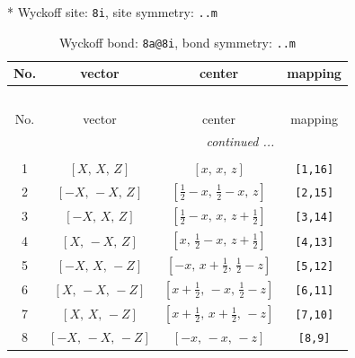 \documentclass[fleqn,8pt]{jsarticle}
\begin{document}
* Wyckoff site: {\tt 8i}, site symmetry: {\tt ..m}
\renewcommand{\arraystretch}{1.2}
\begin{longtable}{cccc}
\caption{Wyckoff bond: {\tt 8a@8i}, bond symmetry: {\tt ..m}}
 \\
 \hline \hline
No. & vector & center & mapping \\ \hline \endfirsthead

\multicolumn{3}{l}{\tablename\ \thetable{}} \\
 \hline \hline
No. & vector & center & mapping \\ \hline \endhead

 \hline \hline
\multicolumn{3}{r}{\footnotesize\it continued ...} \\ \endfoot

 \hline \hline
\multicolumn{3}{r}{} \\ \endlastfoot

1 & $\left[ X,\, X,\, Z \right]$ & $\left[ x,\, x,\, z \right]$ & {\tt [1,16]} \\ \hline
2 & $\left[ - X,\, - X,\, Z \right]$ & $\left[ \frac{1}{2} - x,\, \frac{1}{2} - x,\, z \right]$ & {\tt [2,15]} \\ \hline
3 & $\left[ - X,\, X,\, Z \right]$ & $\left[ \frac{1}{2} - x,\, x,\, z + \frac{1}{2} \right]$ & {\tt [3,14]} \\ \hline
4 & $\left[ X,\, - X,\, Z \right]$ & $\left[ x,\, \frac{1}{2} - x,\, z + \frac{1}{2} \right]$ & {\tt [4,13]} \\ \hline
5 & $\left[ - X,\, X,\, - Z \right]$ & $\left[ - x,\, x + \frac{1}{2},\, \frac{1}{2} - z \right]$ & {\tt [5,12]} \\ \hline
6 & $\left[ X,\, - X,\, - Z \right]$ & $\left[ x + \frac{1}{2},\, - x,\, \frac{1}{2} - z \right]$ & {\tt [6,11]} \\ \hline
7 & $\left[ X,\, X,\, - Z \right]$ & $\left[ x + \frac{1}{2},\, x + \frac{1}{2},\, - z \right]$ & {\tt [7,10]} \\ \hline
8 & $\left[ - X,\, - X,\, - Z \right]$ & $\left[ - x,\, - x,\, - z \right]$ & {\tt [8,9]} \\
\end{longtable}
\renewcommand{\arraystretch}{1.2}
\end{document}
